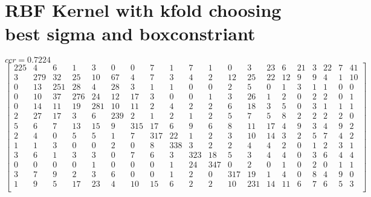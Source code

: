 \documentclass[a4paper, 11pt]{article}
\begin{document}
\section{RBF Kernel with kfold choosing best sigma and boxconstriant}
$ccr=0.7224$
\[\begin{bmatrix}
   225  &   4  &   6  &   1   &  3  &   0 &    0  &   7  &   1  &   7  &   1 &    0  &   3  &  23  &   6  &  21  &   3  &  22  &   7  &  41 \\
     3  & 279  &  32  &  25   & 10  &  67 &    4  &   7  &   3  &   4  &   2 &   12  &  25  &  22  &  12  &   9  &   9  &   4  &   1  &  10 \\
     0  &  13  & 251  &  28   &  4  &  28 &    3  &   1  &   1  &   0  &   0 &    2  &   5  &   0  &   1  &   3  &   1  &   1  &   0  &   0 \\
     0  &  10  &  37  & 276   & 24  &  12 &   17  &   3  &   0  &   0  &   1 &    3  &  26  &   1  &   2  &   0  &   2  &   2  &   0  &   1 \\
     0  &  14  &  11  &  19   &281  &  10 &   11  &   2  &   4  &   2  &   2 &    6  &  18  &   3  &   5  &   0  &   3  &   1  &   1  &   1 \\
     2  &  27  &  17  &   3   &  6  & 239 &    2  &   1  &   2  &   1  &   2 &    5  &   7  &   5  &   8  &   2  &   2  &   2  &   2  &   0 \\
     5  &   6  &   7  &  13   & 15  &   9 &  315  &  17  &   6  &   9  &   6 &    8  &  11  &  17  &   4  &   9  &   3  &   4  &   9  &   2 \\
     2  &   4  &   0  &   5   &  5  &   1 &    7  & 317  &  22  &   1  &   2 &    3  &  10  &  14  &   3  &   2  &   5  &   7  &   4  &   2 \\
     1  &   1  &   3  &   0   &  0  &   2 &    0  &   8  & 338  &   3  &   2 &    2  &   4  &   4  &   2  &   0  &   1  &   2  &   3  &   1 \\
     3  &   6  &   1  &   3   &  3  &   0 &    7  &   6  &   3  & 323  &  18 &    5  &   3  &   4  &   4  &   0  &   3  &   6  &   4  &   4 \\
     0  &   0  &   0  &   0   &  1  &   0 &    0  &   0  &   1  &  24  & 347 &    0  &   2  &   0  &   1  &   0  &   2  &   0  &   1  &   1 \\
     3  &   7  &   9  &   2   &  3  &   6 &    0  &   0  &   1  &   2  &   0 &  317  &  19  &   1  &   4  &   0  &   8  &   4  &   9  &   0 \\
     1  &   9  &   5  &  17   & 23  &   4 &   10  &  15  &   6  &   2  &   2 &   10  & 231  &  14  &  11  &   6  &   7  &   6  &   5  &   3 \\

\end{bmatrix}\]
\end{document}
